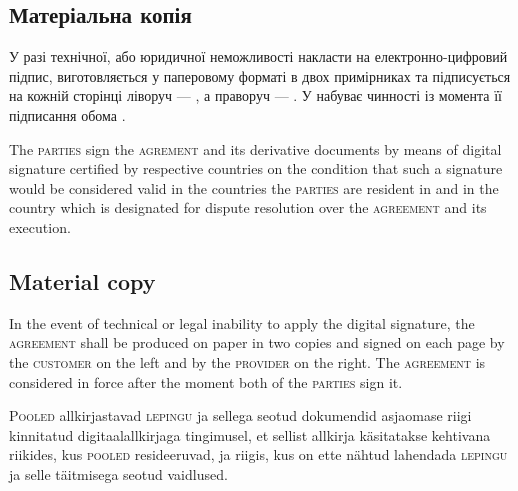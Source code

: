 \begin{Form}
\begin{paracol}{3}
{        \subsection{Матеріальна копія}
        У разі технічної, або юридичної неможливості накласти на  електронно-цифровий підпис,  виготовляється у паперовому форматі в двох примірниках та підписується на кожній сторінці ліворуч — , а праворуч — . У набуває чинності із момента її підписання обома .}
        {The \textsc{parties} sign the \textsc{agrement} and its derivative documents by means of digital signature certified by respective countries on the condition that such a signature would be considered valid in the countries the \textsc{parties} are resident in and in the country which is designated for dispute resolution over the \textsc{agreement} and its execution. 
        \subsection{Material copy}
        In the event of technical or legal inability to apply the digital signature, the \textsc{agreement} shall be produced on paper in two copies and signed on each page by the \textsc{customer} on the left and by the \textsc{provider} on the right. The \textsc{agreement} is considered in force after the moment both of the \textsc{parties} sign it.}
        {P\textsc{ooled} allkirjastavad \textsc{lepingu} ja sellega seotud dokumendid asjaomase riigi kinnitatud digitaalallkirjaga tingimusel, et sellist allkirja käsitatakse kehtivana riikides, kus \textsc{pooled} resideeruvad, ja riigis, kus on ette nähtud lahendada \textsc{lepingu} ja selle täitmisega seotud vaidlused.

}
\end{paracol}
\end{Form}
